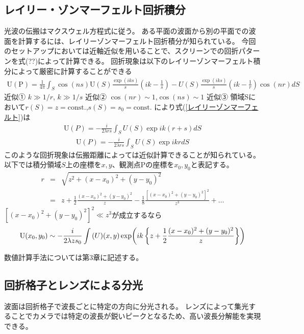 \documentclass[a4paper,11pt,uplatex]{jsbook}
\begin{document}
\subsection{レイリー・ゾンマーフェルト回折積分}\label{sec:rayleigh}
光波の伝搬はマクスウェル方程式に従う。
ある平面の波面から別の平面での波面を計算するには、レイリーゾンマーフェルト回折積分が知られている。
今回のセットアップにおいては近軸近似を用いることで、スクリーンでの回折パターンを式(??)によって計算できる。
回折現象は以下のレイリーゾンマーフェルト積分によって厳密に計算することができる
\begin{eqnarray}
  \text{U}(\text{P}) = \frac{1}{4\pi}\int_{S}\cos(ns)\text{U}(S)\frac{\exp(iks)}{s}\left( ik - \frac{1}{s}\right) -U(S)\frac{\exp(iks)}{s}\left(ik- \frac{1}{r}\right)\cos(nr) dS
\label{レイリーゾンマーフェルト}
\end{eqnarray}
近似① $k \gg 1/r$, $k \gg 1/s$
近似② $\cos(nr) \sim 1$,$\cos(ns) \sim 1$
近似③ 領域Sにおいて$r(S)= z = \text{const.}$,$s(S) = s_0 = \text{const.}$
により式(\ref{レイリーゾンマーフェルト})は
\begin{eqnarray}
  \text{U}(P) = -\frac{i}{2\lambda rs} \int_{S} U(S)\exp ik(r+s) dS
  \label{レイリーゾンマーフェルト近似}
\end{eqnarray}
\begin{eqnarray}
  \text{U}(P) = -\frac{i}{2\lambda rs} \int_{S} U(S)\exp ikr dS
\end{eqnarray}
このような回折現象は伝搬距離によっては近似計算できることが知られている。以下では積分領域$S$上の座標を$x,y$、観測点Pの座標を$x_0,y_0$と表記する。
\begin{eqnarray}
  r &=& \sqrt{z^2 + (x-x_0)^2 + (y-y_0)^2}\\
  &=& z + \frac{1}{2}\frac{(x-x_0)^2 + (y-y_0)^2}{z} - \frac{1}{8}\frac{\left[(x-x_0)^2 + (y-y_0)^2\right]^2}{z^3} +\dots
\end{eqnarray}
$\left[(x-x_0)^2 + (y-y_0)^2\right]^2 \ll z^3$が成立するなら
\begin{eqnarray}
  \text{U}(x_0,y_0) \sim -\frac{i}{2\lambda zs_0}\int \text(U)(x,y) \exp(ik\left\{z +\frac{1}{2}\frac{(x-x_0)^2 + (y-y_0)^2}{z}\right\})
\end{eqnarray}

数値計算手法については第3章に記述する。
\subsection{回折格子とレンズによる分光}\label{sec:grating}
波面は回折格子で波長ごとに特定の方向に分光される。
レンズによって集光することでカメラでは特定の波長が鋭いピークとなるため、高い波長分解能を実現できる。
\end{document}
